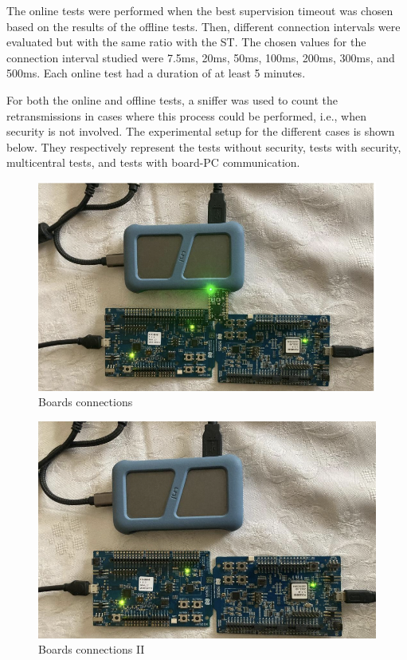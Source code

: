 \documentclass{Configuration_Files/PoliMi3i_thesis}
\begin{document}
The online tests were performed when the best supervision timeout was chosen based on the results of the offline tests. Then, different connection intervals were evaluated but with the same ratio with the ST. The chosen values for the connection interval studied were 7.5ms, 20ms, 50ms, 100ms, 200ms, 300ms, and 500ms. Each online test had a duration of at least 5 minutes.

For both the online and offline tests, a sniffer was used to count the retransmissions in cases where this process could be performed, i.e., when security is not involved. The experimental setup for the different cases is shown below. They respectively represent the tests without security, tests with security, multicentral tests, and tests with board-PC communication.

\begin{figure}[H]
    \centering
    \includegraphics[scale=0.6]{Test_Procedure/4.png}
    \caption{Boards connections}
    \label{ideal_tests_without_security_4}
\end{figure}

\begin{figure}[H]
    \centering
    \includegraphics[scale=0.6]{Test_Procedure/5.png}
    \caption{Boards connections II}
    \label{ideal_tests_with_security_5}
\end{figure}
\end{document}
